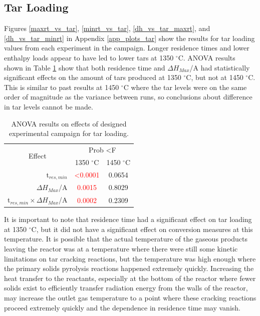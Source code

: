 \documentclass[11pt,twocolumn]{article}
\begin{document}

\subsection*{Tar Loading}

Figures \ref{maxrt_vs_tar}, \ref{minrt_vs_tar}, \ref{dh_vs_tar_maxrt}, and \ref{dh_vs_tar_minrt} in Appendix \ref{app_plots_tar} show the results for tar loading values from each experiment in the campaign.  Longer residence times and lower enthalpy loads appear to have led to lower tars at 1350 $^\circ$C.  ANOVA results shown in Table \ref{anova_tar} show that both residence time and $\Delta H_{Max}$/A had statistically significant effects on the amount of tars produced at 1350 $^\circ$C, but not at 1450 $^\circ$C.  This is similar to past results at 1450 $^\circ$C where the tar levels were on the same order of magnitude as the variance between runs, so conclusions about difference in tar levels cannot be made.

\begin{table}
	\centering
	\caption{ANOVA results on effects of designed experimental campaign for tar loading.}
	\begin{tabular}{r c c}
		\toprule
		\multicolumn{1}{c}{\multirow{2}{*}{Effect}}		& 	\multicolumn{2}{c}{Prob \textless F	}	\\
		{}								&	1350 $^\circ$C	&	1450 $^\circ$C			\\
		\midrule
		t$_{res,min}$						&	\textcolor{red}{\textless 0.0001}	&	0.0654			\\
		$\Delta H_{Max}$/A					&	\textcolor{red}{0.0015}			&	0.8029			\\
		t$_{res,min}\times \Delta H_{Max}$/A	&	\textcolor{red}{0.0002}			&	0.2309			\\
		\bottomrule
	\end{tabular}
	\label{anova_tar}
\end{table}

It is important to note that residence time had a significant effect on tar loading at 1350 $^\circ$C, but it did not have a significant effect on conversion measures at this temperature.  It is possible that the actual temperature of the gaseous products leaving the reactor was at a temperature where there were still some kinetic limitations on tar cracking reactions, but the temperature was high enough where the primary solids pyrolysis reactions happened extremely quickly.  Increasing the heat transfer to the reactants, especially at the bottom of the reactor where fewer solids exist to efficiently transfer radiation energy from the walls of the reactor, may increase the outlet gas temperature to a point where these cracking reactions proceed extremely quickly and the dependence in residence time may vanish.
\end{document}

